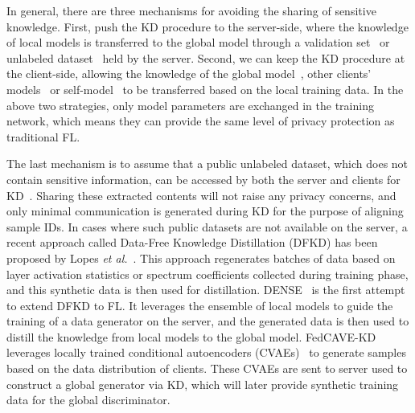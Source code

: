 In general, there are three mechanisms for avoiding the sharing of sensitive knowledge.
First, push the KD procedure to the server-side, where the knowledge of local models is transferred to the global model through a validation set~\cite{sui2020feded} or unlabeled dataset~\cite{lin2020ensemble, guha2018one, chen2020fedbe, xie2023perada, cho2022heterogeneous} held by the server.
Second, we can keep the KD procedure at the client-side, allowing the knowledge of the global model~\cite{yao2019towards, wu2022communication,li2021model, lee2022preservation, mendieta2022local, kim2022multi, he2022class, zhang2023federated}, other clients' models~\cite{jeong2020federated} or self-model~\cite{yao2019towards, jiang2020federated, wu2022communication, li2021model, huang2022learn, jin2022personalized, liang2022rscfed} to be transferred based on the local training data.
In the above two strategies, only model parameters are exchanged in the training network, which means they can provide the same level of privacy protection as traditional FL.

The last mechanism is to assume that a public unlabeled dataset, which does not contain sensitive information, can be accessed by both the server and clients for KD~\cite{li2020practical, li2019fedmd, gong2021ensemble, sun2020federated, huang2022learn, sattler2021fedaux, fang2022robust, gong2022preserving, chang2021cronus, zhang2021parameterized, itahara2021distillation}.
Sharing these extracted contents will not raise any privacy concerns, and only minimal communication is generated during KD for the purpose of aligning sample IDs.
In cases where such public datasets are not available on the server, a recent approach called Data-Free Knowledge Distillation (DFKD) has been proposed by Lopes \textit{et al.}~\cite{lopes2017data}.
This approach regenerates batches of data based on layer activation statistics or spectrum coefficients collected during training phase, and this synthetic data is then used for distillation.
DENSE~\cite{zhang2022dense} is the first attempt to extend DFKD to FL. It leverages the ensemble of local models to guide the training of a data generator on the server, and the generated data is then used to distill the knowledge from local models to the global model.
FedCAVE-KD~\cite{heinbaugh2023data} leverages locally trained conditional autoencoders (CVAEs)~\cite{kingma2014auto} to generate samples based on the data distribution of clients. 
These CVAEs are sent to server used to construct a global generator via KD, which will later provide synthetic training data for the global discriminator.

